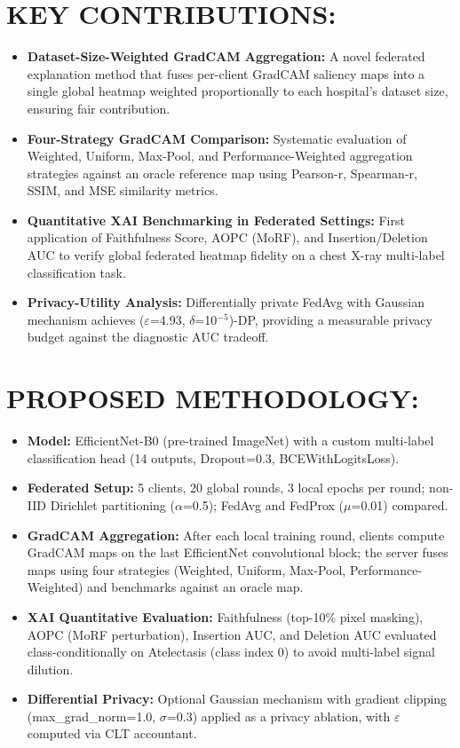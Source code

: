 \documentclass[10pt,a4paper]{article}
\begin{document}
\section*{KEY CONTRIBUTIONS:}
\begin{itemize}
  \item \textbf{Dataset-Size-Weighted GradCAM Aggregation:} A novel federated explanation method that
        fuses per-client GradCAM saliency maps into a single global heatmap weighted proportionally to
        each hospital's dataset size, ensuring fair contribution.
  \item \textbf{Four-Strategy GradCAM Comparison:} Systematic evaluation of Weighted, Uniform,
        Max-Pool, and Performance-Weighted aggregation strategies against an oracle reference map using
        Pearson-r, Spearman-r, SSIM, and MSE similarity metrics.
  \item \textbf{Quantitative XAI Benchmarking in Federated Settings:} First application of
        Faithfulness Score, AOPC (MoRF), and Insertion/Deletion AUC to verify global federated heatmap
        fidelity on a chest X-ray multi-label classification task.
  \item \textbf{Privacy-Utility Analysis:} Differentially private FedAvg with Gaussian mechanism
        achieves ($\varepsilon$=4.93, $\delta$=10$^{-5}$)-DP, providing a measurable privacy budget
        against the diagnostic AUC tradeoff.
\end{itemize}

\section*{PROPOSED METHODOLOGY:}
\begin{itemize}
  \item \textbf{Model:} EfficientNet-B0 (pre-trained ImageNet) with a custom multi-label classification
        head (14 outputs, Dropout=0.3, BCEWithLogitsLoss).
  \item \textbf{Federated Setup:} 5 clients, 20 global rounds, 3 local epochs per round;
        non-IID Dirichlet partitioning ($\alpha$=0.5); FedAvg and FedProx ($\mu$=0.01) compared.
  \item \textbf{GradCAM Aggregation:} After each local training round, clients compute GradCAM maps on
        the last EfficientNet convolutional block; the server fuses maps using four strategies
        (Weighted, Uniform, Max-Pool, Performance-Weighted) and benchmarks against an oracle map.
  \item \textbf{XAI Quantitative Evaluation:} Faithfulness (top-10\% pixel masking), AOPC (MoRF
        perturbation), Insertion AUC, and Deletion AUC evaluated class-conditionally on Atelectasis
        (class index 0) to avoid multi-label signal dilution.
  \item \textbf{Differential Privacy:} Optional Gaussian mechanism with gradient clipping
        (max\_grad\_norm=1.0, $\sigma$=0.3) applied as a privacy ablation, with $\varepsilon$
        computed via CLT accountant.
\end{itemize}
\end{document}
